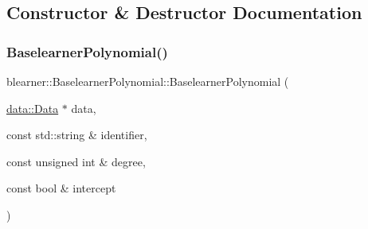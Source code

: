 \subsection{Constructor \& Destructor Documentation}
\mbox{\label{classblearner_1_1_baselearner_polynomial_aba0f1e5bf9566dc7bc674c9d30b44af6}} 
\subsubsection{\texorpdfstring{Baselearner\+Polynomial()}{BaselearnerPolynomial()}}
{\footnotesize\ttfamily blearner\+::\+Baselearner\+Polynomial\+::\+Baselearner\+Polynomial (\begin{DoxyParamCaption}\item[{\mbox{\hyperlink{classdata_1_1_data}{data\+::\+Data}} $\ast$}]{data,  }\item[{const std\+::string \&}]{identifier,  }\item[{const unsigned int \&}]{degree,  }\item[{const bool \&}]{intercept }\end{DoxyParamCaption})}

